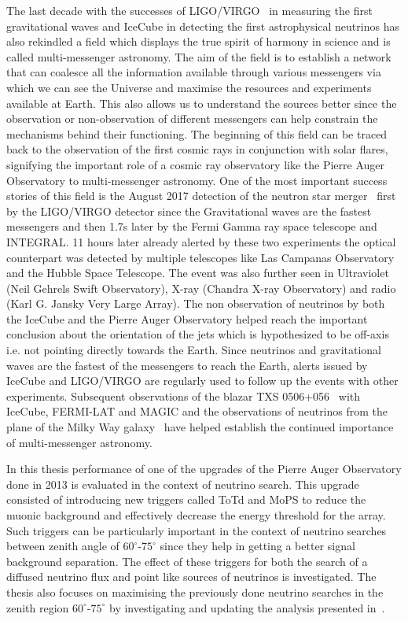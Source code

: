 The last decade with the successes of LIGO/VIRGO~\cite{PhysRevLett.116.061102} in measuring the first gravitational waves and IceCube in detecting the first astrophysical neutrinos has also rekindled a field which displays the true spirit of harmony in science and is called multi-messenger astronomy. The aim of the field is to establish a network that can coalesce all the information available through various messengers via which we can see the Universe and maximise the resources and experiments available at Earth. This also allows us to understand the sources better since the observation or non-observation of different messengers can help constrain the mechanisms behind their functioning. The beginning of this field can be traced back to the observation of the first cosmic rays in conjunction with solar flares, signifying the important role of a cosmic ray observatory like the Pierre Auger Observatory to multi-messenger astronomy. One of the most important success stories of this field is the August 2017 detection of the neutron star merger~\cite{Abbott_2017} first by the LIGO/VIRGO detector since the Gravitational waves are the fastest messengers and then 1.7s later by the Fermi Gamma ray space telescope and INTEGRAL. 11 hours later already alerted by these two experiments the optical counterpart was detected by multiple telescopes like Las Campanas Observatory and the Hubble Space Telescope. The event was also further seen in Ultraviolet (Neil Gehrels Swift Observatory), X-ray (Chandra X-ray Observatory) and radio (Karl G. Jansky Very Large Array). The non observation of neutrinos by both the IceCube and the Pierre Auger Observatory helped reach the important conclusion about the orientation of the jets which is hypothesized to be off-axis i.e. not pointing directly towards the Earth. Since neutrinos and gravitational waves are the fastest of the messengers to reach the Earth, alerts issued by IceCube and LIGO/VIRGO are regularly used to follow up the events with other experiments. Subsequent observations of the blazar TXS 0506+056~\cite{TXS_Multi_2018} with IceCube, FERMI-LAT and MAGIC and the observations of neutrinos from the plane of the Milky Way galaxy~\cite{Galactic_plane_nu_2023} have helped establish the continued importance of multi-messenger astronomy.

In this thesis performance of one of the upgrades of the Pierre Auger Observatory done in 2013 is evaluated in the context of neutrino search. This upgrade consisted of introducing new triggers called \gls{ToTd} and \gls{MoPS} to reduce the muonic background and effectively decrease the energy threshold for the array. Such triggers can be particularly important in the context of neutrino searches between zenith angle of $60^\circ$-$75^\circ$ since they help in getting a better signal background separation. The effect of these triggers for both the search of a diffused neutrino flux and point like sources of neutrinos is investigated. The thesis also focuses on maximising the previously done neutrino searches in the zenith region $60^\circ$-$75^\circ$ by investigating and updating the analysis presented in~\cite{Aab_2019_diffuse, gap_note_2013}.

